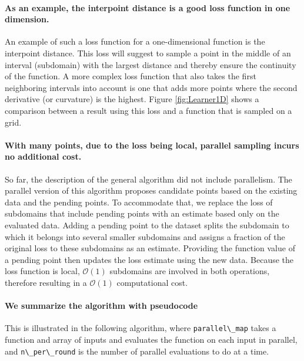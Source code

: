 \documentclass[english, twocolumn, 10pt, aps, superscriptaddress, floatfix, prb, citeautoscript]{revtex4-1}
\newcommand{\passthrough}[1]{\lstset{mathescape=false}#1\lstset{mathescape=true}}
\begin{document}
\paragraph{As an example, the interpoint distance is a good loss function in one dimension.}

An example of such a loss function for a one-dimensional function is the interpoint distance.
This loss will suggest to sample a point in the middle of an interval (subdomain) with the largest distance and thereby ensure the continuity of the function.
A more complex loss function that also takes the first neighboring intervals into account is one that adds more points where the second derivative (or curvature) is the highest.
Figure \ref{fig:Learner1D} shows a comparison between a result using this loss and a function that is sampled on a grid.

\paragraph{With many points, due to the loss being local, parallel sampling incurs no additional cost.}

So far, the description of the general algorithm did not include parallelism.
The parallel version of this algorithm proposes candidate points based on the existing data and the pending points.
To accommodate that, we replace the loss of subdomains that include pending points with an estimate based only on the evaluated data.
Adding a pending point to the dataset splits the subdomain to which it belongs into several smaller subdomains and assigns a fraction of the original loss to these subdomains as an estimate.
Providing the function value of a pending point then updates the loss estimate using the new data.
Because the loss function is local, \(\mathcal{O}(1)\) subdomains are involved in both operations, therefore resulting in a \(\mathcal{O}(1)\) computational cost.

\paragraph{We summarize the algorithm with pseudocode}

This is illustrated in the following algorithm, where \passthrough{\lstinline!parallel\_map!} takes a function and array of inputs and evaluates the function on each input in parallel, and \passthrough{\lstinline!n\_per\_round!} is the number of parallel evaluations to do at a time.
\end{document}

